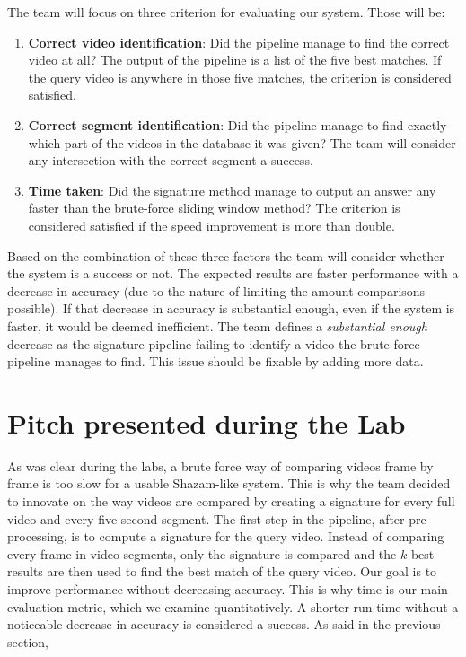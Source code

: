\documentclass{article}
\newcommand\tab[1][1cm]{\hspace*{#1}}
\begin{document}
The team will focus on three criterion for evaluating our system. Those will be: \begin{enumerate}

    \item \textbf{Correct video identification}: Did the pipeline manage to find the correct video at all? The output of the pipeline is a list of the five best matches. If the query video is anywhere in those five matches, the criterion is considered satisfied.
    \item \textbf{Correct segment identification}: Did the pipeline manage to find exactly which part of the videos in the database it was given? The team will consider any intersection with the correct segment a success.
    \item \textbf{Time taken}: Did the signature method manage to output an answer any faster than the brute-force sliding window method? The criterion is considered satisfied if the speed improvement is more than double.
\end{enumerate}


\tab Based on the combination of these three factors the team will consider whether the system is a success or not. The expected results are faster performance with a decrease in accuracy (due to the nature of limiting the amount comparisons possible). If that decrease in accuracy is substantial enough, even if the system is faster, it would be deemed inefficient. The team defines a \textit{substantial enough} decrease as the signature pipeline failing to identify a video the brute-force pipeline manages to find. This issue should be fixable by adding more data. 

\section*{Pitch presented during the Lab}
\tab As was clear during the labs, a brute force way of comparing videos frame by frame is too slow for a usable Shazam-like system. This is why the team decided to innovate on the way videos are compared by creating a signature for every full video and every five second segment. The first step in the pipeline, after pre-processing, is to compute a signature for the query video. Instead of comparing every frame in video segments, only the signature is compared and the $k$ best results are then used to find the best match of the query video.
Our goal is to improve performance without decreasing accuracy. This is why time is our main evaluation metric, which we examine quantitatively. A shorter run time without a noticeable decrease in accuracy is considered a success. As said in the previous section, 
\end{document}
